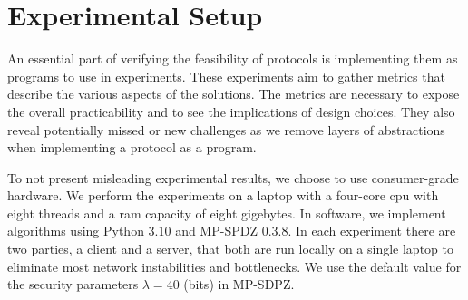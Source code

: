 \section{Experimental Setup}
\label{sec:experimentalsetup}

An essential part of verifying the feasibility of protocols is implementing them as programs to use in experiments. These experiments aim to gather metrics that describe the various aspects of the solutions. The metrics are necessary to expose the overall practicability and to see the implications of design choices. They also reveal potentially missed or new challenges as we remove layers of abstractions when implementing a protocol as a program.

To not present misleading experimental results, we choose to use consumer-grade hardware. We perform the experiments on a laptop with a four-core \acrfull{cpu} with eight threads and a \acrfull{ram} capacity of eight gigebytes. In software, we implement algorithms using Python 3.10 and MP-SPDZ \cite{CCS:Keller20} 0.3.8. In each experiment there are two parties, a client and a server, that both are run locally on a single laptop to eliminate most network instabilities and bottlenecks. We use the default value for the security parameters $ \lambda = 40 $ (bits) in MP-SDPZ.